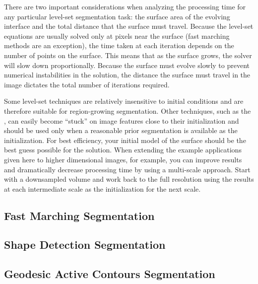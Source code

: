 There are two important considerations when analyzing the processing time for
any particular level-set segmentation task: the surface area of the evolving
interface and the total distance that the surface must travel.  Because the
level-set equations are usually solved only at pixels near the surface (fast
marching methods are an exception), the time taken at each iteration depends on
the number of points on the surface.  This means that as the surface grows, the
solver will slow down proportionally.  Because the surface must evolve slowly
to prevent numerical instabilities in the solution, the distance the surface
must travel in the image dictates the total number of iterations required.

Some level-set techniques are relatively insensitive to initial conditions
and are therefore suitable for region-growing segmentation. Other techniques,
such as the , can easily
become ``stuck'' on image features close to their initialization and should
be used only when a reasonable prior segmentation is available as the
initialization.  For best efficiency, your initial model of the surface
should be the best guess possible for the solution.  When extending the
example applications given here to higher dimensional images, for example,
you can improve results and dramatically decrease processing time by using a
multi-scale approach. Start with a downsampled volume and work back to the
full resolution using the results at each intermediate scale as the
initialization for the next scale.


\subsection{Fast Marching Segmentation}
\label{sec:FastMarchingImageFilter}

\ifitkFullVersion

\fi


\subsection{Shape Detection Segmentation}
\label{sec:ShapeDetectionLevelSetFilter}

\ifitkFullVersion

\fi


\subsection{Geodesic Active Contours Segmentation}
\label{sec:GeodesicActiveContourImageFilter}

